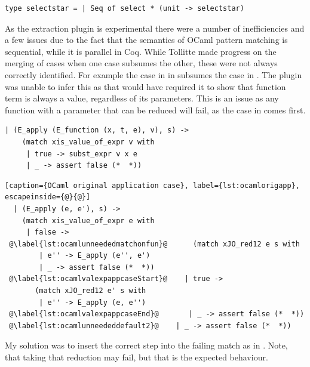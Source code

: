\documentclass[12pt,twoside,notitlepage]{report}
\theoremstyle{plain}%
\theoremstyle{definition}
\theoremstyle{remark}
\begin{document}
\begin{minipage}{\linewidth}

\begin{lstlisting}[caption={OCaml stream selectstar}, label={lst:ocamlstreamstar}]
type selectstar = | Seq of select * (unit -> selectstar) 
\end{lstlisting}

\end{minipage}

As the extraction plugin is experimental there were a number of inefficiencies and a few issues due to the fact that the semantics of OCaml pattern matching is sequential, while it is parallel in Coq. While Tollitte\cite{tollitte2012producing} made progress on the merging of cases when one case subsumes the other, these were not always correctly identified. For example the case in  in  subsumes the case in . The plugin was unable to infer this as that would have required it to show that function term is always a value, regardless of its parameters. This is an issue as any function with a parameter that can be reduced will fail, as the case in  comes first.


\vspace{3mm}

\begin{minipage}{\linewidth}

\begin{lstlisting}[caption={OCaml original substitution case}, label={lst:ocamlorigsub}]
  | (E_apply (E_function (x, t, e), v), s) ->
    (match xis_value_of_expr v with
     | true -> subst_expr v x e
     | _ -> assert false (*  *))
\end{lstlisting}

\end{minipage}

\begin{minipage}{\linewidth}

\begin{lstlisting}[caption={OCaml original application case}, label={lst:ocamlorigapp}, escapeinside={@}{@}]
  | (E_apply (e, e'), s) ->
    (match xis_value_of_expr e with
     | false ->
 @\label{lst:ocamlunneededmatchonfun}@      (match xJO_red12 e s with
        | e'' -> E_apply (e'', e')
        | _ -> assert false (*  *))
 @\label{lst:ocamlvalexpappcaseStart}@    | true ->
       (match xJO_red12 e' s with
        | e'' -> E_apply (e, e'')
 @\label{lst:ocamlvalexpappcaseEnd}@       | _ -> assert false (*  *))
 @\label{lst:ocamlunneededdefault2}@    | _ -> assert false (*  *))
\end{lstlisting}

\end{minipage}
My solution was to insert the correct step into the failing match as in . Note, that taking that reduction may fail, but that is the expected behaviour.
\end{document}
